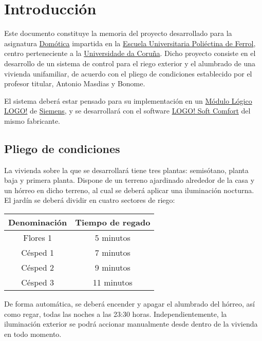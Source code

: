 \section{Introducci\'on}

Este documento constituye la memoria del proyecto desarrollado para la asignatura \href{https://campusvirtual.udc.es/guiadocente/guia_docent/index.php?centre=770&ensenyament=770611&assignatura=770611541&idioma=}{Dom\'otica} impartida en la \href{http://lucas.cdf.udc.es/}{Escuela Universitaria Poli\'ectina de Ferrol}, centro perteneciente a la \href{http://www.udc.es}{Universidade da Coruña}. Dicho proyecto consiste en el desarrollo de un sistema de control para el riego exterior y el alumbrado de una vivienda unifamiliar, de acuerdo con el pliego de condiciones establecido por el profesor titular, Antonio Masdias y Bonome.

El sistema deber\'a estar pensado para su implementaci\'on en un \hyperref[LOGO]{M\'odulo L\'ogico LOGO!} de \hyperref[Siemens]{Siemens}, y se desarrollar\'a con el software \href{http://www.automation.siemens.com/mcms/programmable-logic-controller/en/logic-module-logo/logo-software/Pages/Default.aspx}{LOGO! Soft Comfort} del mismo fabricante.

\subsection{Pliego de condiciones}

La vivienda sobre la que se desarrollar\'a tiene tres plantas: semis\'otano, planta baja y primera planta. Dispone de un terreno ajardinado alrededor de la casa y un h\'orreo en dicho terreno, al cual se deber\'a aplicar una iluminaci\'on nocturna.
El jard\'in se deber\'a dividir en cuatro sectores de riego:

\begin{center}
\begin{tabular}[c]{c|c}
  Denominaci\'on & Tiempo de regado \\
  \hline
  Flores 1 & 5 minutos \\
  Césped 1 & 7 minutos \\
  Césped 2 & 9 minutos \\
  Césped 3 & 11 minutos \\
\end{tabular}
\end{center}

De forma autom\'atica, se deber\'a encender y apagar el alumbrado del h\'orreo, as\'i como regar, todas las noches a las 23:30 horas. Independientemente, la iluminaci\'on exterior se podr\'a accionar manualmente desde dentro de la vivienda en todo momento.

